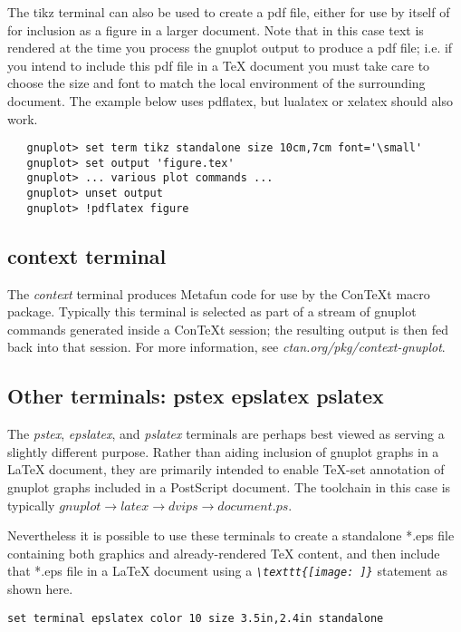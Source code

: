 \documentclass[letterpaper,11pt]{article}
\begin{document}
The tikz terminal can also be used to create a pdf file, either for use by
itself of for inclusion as a figure in a larger document.  Note that in this
case text is rendered at the time you process the gnuplot output to produce
a pdf file; i.e. if you intend to include this pdf file in a {\TeX} document
you must take care to choose the size and font to match the local environment
of the surrounding document.
The example below uses pdflatex, but lualatex or xelatex should also work.
\begin{verbatim}
   gnuplot> set term tikz standalone size 10cm,7cm font='\small'
   gnuplot> set output 'figure.tex'
   gnuplot> ... various plot commands ...
   gnuplot> unset output
   gnuplot> !pdflatex figure
\end{verbatim}

\newpage

\subsection*{context terminal}

The {\em context} terminal produces Metafun code for use by the
ConTeXt macro package. Typically this terminal is selected as part of a stream
of gnuplot commands generated inside a ConTeXt session; the resulting output
is then fed back into that session.
For more information, see {\em ctan.org/pkg/context-gnuplot}.

\subsection*{Other terminals: pstex epslatex pslatex}

The {\em pstex}, {\em epslatex}, and {\em pslatex} terminals are perhaps
best viewed as serving a slightly different purpose.
Rather than aiding inclusion of gnuplot graphs in a {\LaTeX} document,
they are primarily intended to enable {\TeX}-set annotation of gnuplot graphs
included in a PostScript document.  The toolchain in this case is typically
{$ gnuplot \rightarrow latex \rightarrow dvips \rightarrow document.ps$}.

Nevertheless it is possible to use these terminals to create a standalone
*.eps file containing both graphics and already-rendered {\TeX} content,
and then include that *.eps file in a {\LaTeX} document using a
{\em {\verb+\texttt{[image: ]}+}} statement as shown here.

\begin{verbatim}
set terminal epslatex color 10 size 3.5in,2.4in standalone
\end{verbatim}
\end{document}
